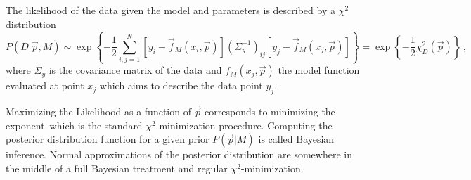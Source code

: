 \documentclass[paper=a4, fontsize=12pt, prl, notitlepage]{revtex4-1}
\begin{document}
The likelihood of the data given the model and parameters is described by a $\chi^2$ distribution
\begin{equation}
    P(D|\vec p, M)
    \sim
    \exp\left\{
        - \frac{1}{2}
        \sum_{i,j=1}^N
        \left[y_i - \vec f_M(x_i, \vec p)\right]
        \left(\Sigma_y^{-1}\right)_{ij}
        \left[y_j - \vec f_M(x_j, \vec p)\right]
    \right\}
    =
    \exp\left\{
        - \frac{1}{2}
        \chi^2_D(\vec p)
    \right\}
    \, ,
\end{equation}
where $\Sigma_y$ is the covariance matrix of the data and $f_M(x_j, \vec p)$ the model function evaluated at point $x_j$ which aims to describe the data point $y_j$.

Maximizing the Likelihood as a function of $\vec p$ corresponds to minimizing the exponent--which is the standard $\chi^2$-minimization procedure.
Computing the posterior distribution function for a given prior $P(\vec p| M)$ is called Bayesian inference.
Normal approximations of the posterior distribution are somewhere in the middle of a full Bayesian treatment and regular $\chi^2$-minimization.
\end{document}
